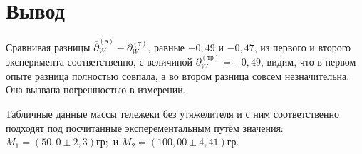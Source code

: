 \documentclass[12pt]{article}
\begin{document}
\section*{Вывод}
Сравнивая разницы $\overline{\partial}^{(э)}_{W} - \partial^{(т)}_{W}$, равные $-0,49$ и $-0,47$, из первого и второго эксперимента соответственно, с величиной $\partial^{(тр)}_{W} = -0,49$, видим, что в первом опыте разница полностью совпала, а во втором разница совсем незначительна. Она вызвана погрешностью в измерении. 

Табличные данные массы тележеки без утяжелителя и с ним соответственно подходят под посчитанные эксперементальным путём значения: ${M_{1} =(50,0\pm2,3)гр;}$ и ${M_{2} =(100,00\pm4,41)гр.}$
\end{document}
